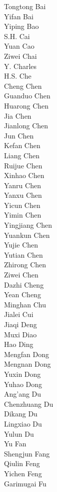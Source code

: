 Tongtong Bai\\
Yifan Bai\\
Yiping Bao\\
S.H. Cai\\
Yuan Cao\\
Ziwei Chai\\
Y. Charles\\
H.S. Che\\
Cheng Chen\\
Guanduo Chen\\
Huarong Chen\\
Jia Chen\\
Jianlong Chen\\
Jun Chen\\
Kefan Chen\\
Liang Chen\\
Ruijue Chen\\
Xinhao Chen\\
Yanru Chen\\
Yanxu Chen\\
Yicun Chen\\
Yimin Chen\\
Yingjiang Chen\\
Yuankun Chen\\
Yujie Chen\\
Yutian Chen\\
Zhirong Chen\\
Ziwei Chen\\
Dazhi Cheng\\
Yean Cheng\\
Minghan Chu\\
Jialei Cui\\
Jiaqi Deng\\
Muxi Diao\\
Hao Ding\\
Mengfan Dong\\
Mengnan Dong\\
Yuxin Dong\\
Yuhao Dong \\
Ang'ang Du\\
Chenzhuang Du\\
Dikang Du\\
Lingxiao Du\\
Yulun Du\\
Yu Fan\\
Shengjun Fang\\
Qiulin Feng\\
Yichen Feng\\
Garimugai Fu\\
